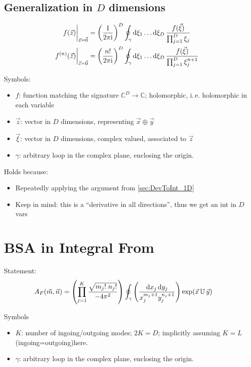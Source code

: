 \documentclass[
	english,
	a4paper,
	fontsize=10pt,
	parskip=half,
	titlepage=true,
	DIV=12,
	final
]{scrreprt}
\newcommand*{\ie}{i.\,e.\xspace}
\newcommand*{\thus}{\ensuremath{\rightarrow}\xspace}
\newcommand*{\iunit}{\ensuremath{\mathrm{i}}}
\newcommand*{\setComplex}  {\ensuremath{\mathbb{C}}}
\begin{document}
\subsection{Generalization in $D$ dimensions} 
\label{sec:DevToInt_DD}
\begin{align}
	\eval{ f(\vec{z}) }_{\vec{z} = \vec{0}}
&=
	\qty(
		\frac{1}{2\pi \iunit}
	)^{D}
	\oint_{\gamma} \dd{\xi_1} \ldots \dd{\xi_D}
		\frac
			{f(\vec{\xi})}
			{\prod_{j=1}^{D} \xi_j}
\\
	\eval{ f^{(n)}(\vec{z}) }_{\vec{z} = \vec{0}}
&=
	\qty(
		\frac{n!}{2\pi \iunit}
	)^{D}
	\oint_{\gamma} \dd{\xi_1} \ldots \dd{\xi_D}
		\frac
			{f(\vec{\xi})}
			{\prod_{j=1}^{D} \xi_j^{n+1}}
\end{align}

Symbols:
\begin{itemize}
\item $f$: function matching the signature $\setComplex^{D} \thus \setComplex$; holomorphic, \ie
	holomorphic in each variable
\item $\vec{z}$: vector in $D$ dimensions, representing $\vec{x} \oplus \vec{y}$
\item $\vec{\xi}$: vector in $D$ dimensions, complex valued, associated to $\vec{z}$
\item $\gamma$: arbitrary loop in the complex plane, enclosing the origin.
\end{itemize}

Holds because:
\begin{itemize}
\item Repeatedly applying the argument from \ref{sec:DevToInt_1D}
\item Keep in mind: this is a \enquote{derivative in all directions}, thus we get an int in $D$ vars
\end{itemize}

\section{BSA in Integral From}
Statement:
\begin{align}
	A_F(\vec{m}, \vec{n})
&=
	\qty(
		\prod_{j=1}^{K}
		\frac
			{\sqrt{m_j! \; n_j!}}
			{-4\pi^{2}}
	)
	\oint_{\gamma}
		\qty(
			\frac
			{\dd{x_j} \dd{y_j}}
			{x_j^{m_j+1}  y_j^{n_j+1}}
		)
		\exp(\vec{x} \, \mathbb{U} \, \vec{y})
\end{align}

Symbols
\begin{itemize}
\item $K$: number of ingoing/outgoing modes; $2K = D$; implicitly assuming $K=L$ (ingoing=outgoing)here.
\item $\gamma$: arbitrary loop in the complex plane, enclosing the origin.
\end{itemize}
\end{document}
